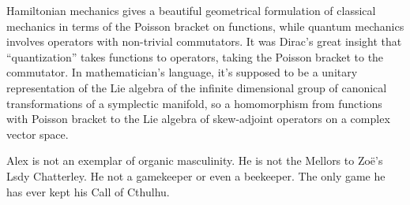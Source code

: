 Hamiltonian mechanics gives a beautiful geometrical formulation of classical mechanics in terms of the Poisson bracket on functions, while quantum mechanics involves operators with non-trivial commutators. It was Dirac’s great insight that “quantization” takes functions to operators, taking the Poisson bracket to the commutator. In mathematician’s language, it’s supposed to be a unitary representation of the Lie algebra of the infinite dimensional group of canonical transformations of a symplectic manifold, so a homomorphism from functions with Poisson bracket to the Lie algebra of skew-adjoint operators on a complex vector space.

Alex is not an exemplar of organic masculinity. He is not the Mellors to Zo{\"e}'s Lsdy Chatterley. He not a gamekeeper or even a beekeeper. The only game he has ever kept his {\twelvesl Call of Cthulhu}.
 \vfill\eject
